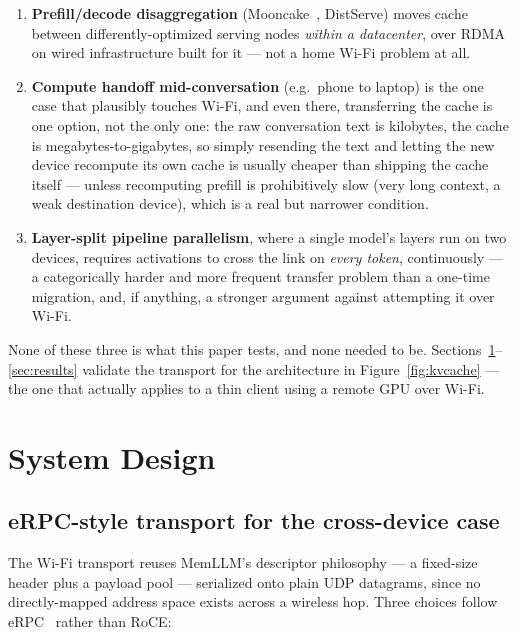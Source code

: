 \documentclass[11pt]{article}
\begin{document}
\begin{enumerate}[leftmargin=22pt]
\item \textbf{Prefill/decode disaggregation} (Mooncake~\cite{mooncake}, DistServe) moves cache between differently-optimized serving nodes \emph{within a datacenter}, over RDMA on wired infrastructure built for it --- not a home Wi-Fi problem at all.
\item \textbf{Compute handoff mid-conversation} (e.g.\ phone to laptop) is the one case that plausibly touches Wi-Fi, and even there, transferring the cache is one option, not the only one: the raw conversation text is kilobytes, the cache is megabytes-to-gigabytes, so simply resending the text and letting the new device recompute its own cache is usually cheaper than shipping the cache itself --- unless recomputing prefill is prohibitively slow (very long context, a weak destination device), which is a real but narrower condition.
\item \textbf{Layer-split pipeline parallelism}, where a single model's layers run on two devices, requires activations to cross the link on \emph{every token}, continuously --- a categorically harder and more frequent transfer problem than a one-time migration, and, if anything, a stronger argument against attempting it over Wi-Fi.
\end{enumerate}

None of these three is what this paper tests, and none needed to be. Sections~\ref{sec:design}--\ref{sec:results} validate the transport for the architecture in Figure~\ref{fig:kvcache} --- the one that actually applies to a thin client using a remote GPU over Wi-Fi.

\section{System Design}
\label{sec:design}

\subsection{eRPC-style transport for the cross-device case}
The Wi-Fi transport reuses MemLLM's descriptor philosophy --- a fixed-size header plus a payload pool --- serialized onto plain UDP datagrams, since no directly-mapped address space exists across a wireless hop. Three choices follow eRPC~\cite{erpc} rather than RoCE:
\end{document}
